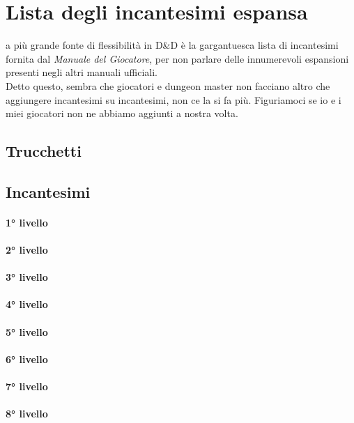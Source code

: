 \section{Lista degli incantesimi espansa}

a più grande fonte di flessibilità in D\&D è la gargantuesca lista di incantesimi fornita dal \textit{Manuale del Giocatore}, per non parlare delle innumerevoli espansioni presenti negli altri manuali ufficiali. \\ Detto questo, sembra che giocatori e dungeon master non facciano altro che aggiungere incantesimi su incantesimi, non ce la si fa più. Figuriamoci se io e i miei giocatori non ne abbiamo aggiunti a nostra volta.

\subsection{Trucchetti}

\subsection{Incantesimi}
\paragraph{1° livello}
\paragraph{2° livello}
\paragraph{3° livello}
\paragraph{4° livello}
\paragraph{5° livello}
\paragraph{6° livello}
\paragraph{7° livello}
\paragraph{8° livello}
